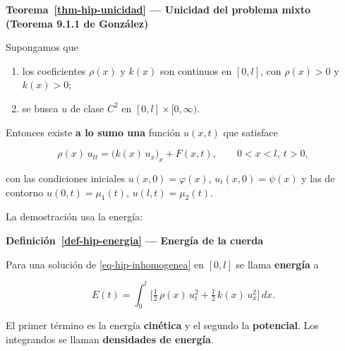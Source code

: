 \documentclass[
  spanish,
  a4paper,
]{scrbook}
\providecommand{\tightlist}{%
  \setlength{\itemsep}{0pt}\setlength{\parskip}{0pt}}
\theoremstyle{definition}
\theoremstyle{plain}
\theoremstyle{definition}
\theoremstyle{plain}
\theoremstyle{definition}
\theoremstyle{remark}
\begin{document}
\begin{tcolorbox}[enhanced jigsaw, arc=.35mm, bottomrule=.15mm, breakable, colback=white, colframe=quarto-callout-note-color-frame, left=2mm, leftrule=.75mm, opacityback=0, rightrule=.15mm, toprule=.15mm]
\begin{minipage}[t]{5.5mm}
\textcolor{quarto-callout-note-color}{\faInfo}
\end{minipage}%
\begin{minipage}[t]{\textwidth - 5.5mm}

\vspace{-3mm}\textbf{Teorema~\ref{thm-hip-unicidad} --- Unicidad del problema mixto (Teorema
9.1.1 de González)}\vspace{3mm}

Supongamos que

\begin{enumerate}
\def\labelenumi{\arabic{enumi}.}
\tightlist
\item
  los coeficientes \(\rho(x)\) y \(k(x)\) son continuos en \([0,l]\),
  con \(\rho(x)>0\) y \(k(x)>0\);
\item
  se busca \(u\) de clase \(C^2\) en \([0,l]\times[0,\infty)\).
\end{enumerate}

Entonces existe \textbf{a lo sumo una} función \(u(x,t)\) que satisface

\[
\rho(x)\,u_{tt} = \big(k(x)\,u_x\big)_x + F(x,t), \qquad 0<x<l,\ t>0,
\]

con las condiciones iniciales \(u(x,0) = \varphi(x)\),
\(u_t(x,0) = \psi(x)\) y las de contorno \(u(0,t) = \mu_1(t)\),
\(u(l,t) = \mu_2(t)\).

\end{minipage}%
\end{tcolorbox}

La demostración usa la energía:

\begin{tcolorbox}[enhanced jigsaw, arc=.35mm, bottomrule=.15mm, breakable, colback=white, colframe=quarto-callout-note-color-frame, left=2mm, leftrule=.75mm, opacityback=0, rightrule=.15mm, toprule=.15mm]
\begin{minipage}[t]{5.5mm}
\textcolor{quarto-callout-note-color}{\faInfo}
\end{minipage}%
\begin{minipage}[t]{\textwidth - 5.5mm}

\vspace{-3mm}\textbf{Definición~\ref{def-hip-energia} --- Energía de la cuerda}\vspace{3mm}

Para una solución de \ref{eq-hip-inhomogenea} en \([0,l]\) se llama
\textbf{energía} a

\[
E(t) = \int_0^l \Big[\tfrac12\,\rho(x)\,u_t^2 + \tfrac12\,k(x)\,u_x^2\Big]\,dx .
\]

El primer término es la energía \textbf{cinética} y el segundo la
\textbf{potencial}. Los integrandos se llaman \textbf{densidades de
energía}.

\end{minipage}%
\end{tcolorbox}
\end{document}
